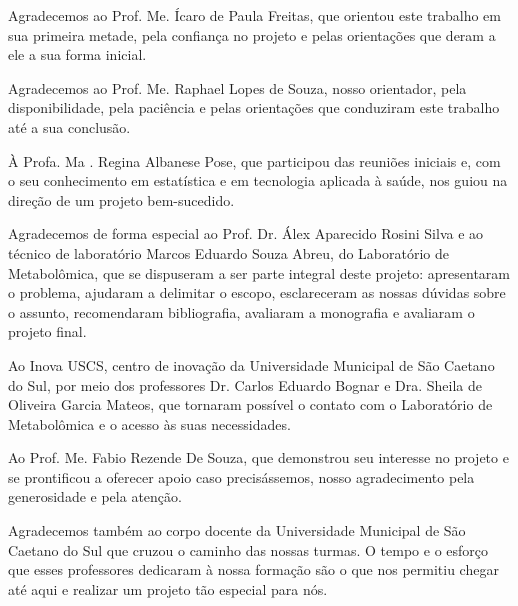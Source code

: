 
\begin{agradecimentos}

Agradecemos ao Prof. Me. Ícaro de Paula Freitas, que orientou este trabalho em sua primeira metade, pela confiança no projeto e pelas orientações que deram a ele a sua forma inicial.

Agradecemos ao Prof. Me. Raphael Lopes de Souza, nosso orientador, pela disponibilidade, pela paciência e pelas orientações que conduziram este trabalho até a sua conclusão.

À Profa. Ma . Regina Albanese Pose, que participou das reuniões iniciais e, com o seu conhecimento em estatística e em tecnologia aplicada à saúde, nos guiou na direção de um projeto bem-sucedido.

Agradecemos de forma especial ao Prof. Dr. Álex Aparecido Rosini Silva e ao técnico de laboratório Marcos Eduardo Souza Abreu, do Laboratório de Metabolômica, que se dispuseram a ser parte integral deste projeto: apresentaram o problema, ajudaram a delimitar o escopo, esclareceram as nossas dúvidas sobre o assunto, recomendaram bibliografia, avaliaram a monografia e avaliaram o projeto final.

Ao Inova USCS, centro de inovação da Universidade Municipal de São Caetano do Sul, por meio dos professores Dr. Carlos Eduardo Bognar e Dra. Sheila de Oliveira Garcia Mateos, que tornaram possível o contato com o Laboratório de Metabolômica e o acesso às suas necessidades.

Ao Prof. Me. Fabio Rezende De Souza, que demonstrou seu interesse no projeto e se prontificou a oferecer apoio caso precisássemos, nosso agradecimento pela generosidade e pela atenção.

Agradecemos também ao corpo docente da Universidade Municipal de São Caetano do Sul que cruzou o caminho das nossas turmas. O tempo e o esforço que esses professores dedicaram à nossa formação são o que nos permitiu chegar até aqui e realizar um projeto tão especial para nós.

\end{agradecimentos}


